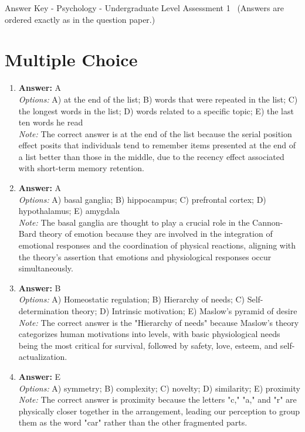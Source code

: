 \documentclass[12pt]{article}
\begin{document}
\begin{center}
Answer Key - Psychology - Undergraduate Level Assessment 1 \
\small (Answers are ordered exactly as in the question paper.)
\end{center}

\section*{Multiple Choice}
\begin{enumerate}[label=\arabic*.]
\item \textbf{Answer:} A
\\ \textit{Options:} A) at the end of the list; B) words that were repeated in the list; C) the longest words in the list; D) words related to a specific topic; E) the last ten words he read
\\ \textit{Note:} The correct answer is at the end of the list because the serial position effect posits that individuals tend to remember items presented at the end of a list better than those in the middle, due to the recency effect associated with short-term memory retention.
\item \textbf{Answer:} A
\\ \textit{Options:} A) basal ganglia; B) hippocampus; C) prefrontal cortex; D) hypothalamus; E) amygdala
\\ \textit{Note:} The basal ganglia are thought to play a crucial role in the Cannon-Bard theory of emotion because they are involved in the integration of emotional responses and the coordination of physical reactions, aligning with the theory's assertion that emotions and physiological responses occur simultaneously.
\item \textbf{Answer:} B
\\ \textit{Options:} A) Homeostatic regulation; B) Hierarchy of needs; C) Self-determination theory; D) Intrinsic motivation; E) Maslow's pyramid of desire
\\ \textit{Note:} The correct answer is the "Hierarchy of needs" because Maslow's theory categorizes human motivations into levels, with basic physiological needs being the most critical for survival, followed by safety, love, esteem, and self-actualization.
\item \textbf{Answer:} E
\\ \textit{Options:} A) symmetry; B) complexity; C) novelty; D) similarity; E) proximity
\\ \textit{Note:} The correct answer is proximity because the letters "c," "a," and "r" are physically closer together in the arrangement, leading our perception to group them as the word "car" rather than the other fragmented parts.

\end{enumerate}
\end{document}
